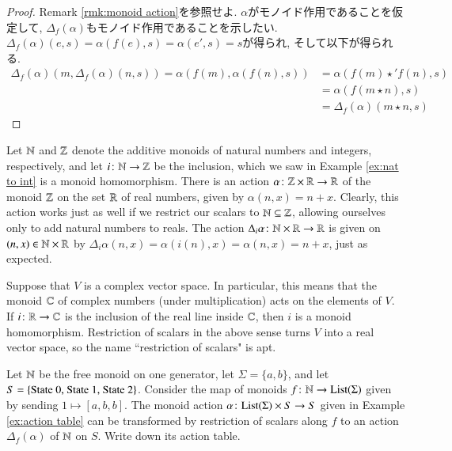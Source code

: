 \begin{proof}

Remark \ref{rmk:monoid action}を参照せよ. $\alpha$がモノイド作用であることを仮定して, $\Delta_f(\alpha)$もモノイド作用であることを示したい. $\Delta_f(\alpha)(e,s)=\alpha(f(e),s)=\alpha(e',s)=s$が得られ, そして以下が得られる. 
\begin{align*}
\Delta_f(\alpha)(m,\Delta_f(\alpha)(n,s))=\alpha(f(m),\alpha(f(n),s))&=\alpha(f(m)\star' f(n),s)\\
&=\alpha(f(m\star n),s)\\
&=\Delta_f(\alpha)(m\star n,s)
\end{align*}

\end{proof}

\begin{example}

Let ${\mathbb N}$ and ${\mathbb Z}$ denote the additive monoids of natural numbers and integers, respectively, and let $i\colon{\mathbb N}\rightarrow{\mathbb Z}$ be the inclusion, which we saw in Example \ref{ex:nat to int} is a monoid homomorphism. There is an action $\alpha\colon{\mathbb Z}\times{\mathbb R}\rightarrow{\mathbb R}$ of the monoid ${\mathbb Z}$ on the set ${\mathbb R}$ of real numbers, given by $\alpha(n,x)=n+x$. Clearly, this action works just as well if we restrict our scalars to ${\mathbb N}\subseteq{\mathbb Z}$, allowing ourselves only to add natural numbers to reals. The action $\Delta_i\alpha\colon{\mathbb N}\times{\mathbb R}\rightarrow{\mathbb R}$ is given on $(n,x)\in{\mathbb N}\times{\mathbb R}$ by $\Delta_i\alpha(n,x)=\alpha(i(n),x)=\alpha(n,x)=n+x$, just as expected.

\end{example}

\begin{example}

Suppose that $V$ is a complex vector space. In particular, this means that the monoid ${\mathbb C}$ of complex numbers (under multiplication) acts on the elements of $V$. If $i\colon{\mathbb R}\rightarrow{\mathbb C}$ is the inclusion of the real line inside ${\mathbb C}$, then $i$ is a monoid homomorphism. Restriction of scalars in the above sense turns $V$ into a real vector space, so the name ``restriction of scalars" is apt.

\end{example}

\begin{exercise}
Let ${\mathbb N}$ be the free monoid on one generator, let $\Sigma=\{a,b\}$, and let $S=\{\tn{State 0, State 1, State 2}\}$. Consider the map of monoids $f\taking\NN\to\List(\Sigma)$ given by sending $1\mapsto [a,b,b]$. The monoid action $\alpha\taking\List(\Sigma)\times S\to S$ given in Example \ref{ex:action table} can be transformed by restriction of scalars along $f$ to an action $\Delta_f(\alpha)$ of ${\mathbb N}$ on $S$. Write down its action table.
\end{exercise}



